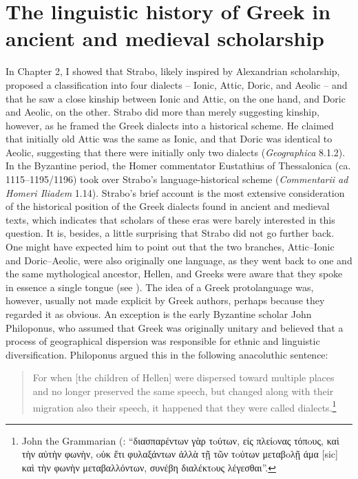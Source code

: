 \section{The linguistic history of Greek in ancient and medieval scholarship}\label{sec:5.1}

In Chapter 2, I showed that Strabo, likely inspired by Alexandrian scholarship, proposed a classification into four dialects – Ionic, Attic, Doric, and Aeolic – and that he saw a close kinship between Ionic and Attic, on the one hand, and Doric and Aeolic, on the other. Strabo did more than merely suggesting kinship, however, as he framed the Greek dialects into a historical scheme. He claimed that initially old Attic was the same as Ionic, and that Doric was identical to Aeolic, suggesting that there were initially only two dialects (\textit{Geographica} 8.1.2). In the Byzantine period, the Homer commentator Eustathius of Thessalonica (ca. 1115–1195/1196) took over Strabo’s language-historical scheme (\textit{Commentarii ad Homeri Iliadem} 1.14). Strabo’s brief account is the most extensive consideration of the historical position of the Greek dialects found in ancient and medieval texts, which indicates that scholars of these eras were barely interested in this question. It is, besides, a little surprising that Strabo did not go further back. One might have expected him to point out that the two branches, Attic–Ionic and Doric–Aeolic, were also originally one language, as they went back to one and the same mythological ancestor, Hellen, and Greeks were aware that they spoke in essence a single tongue (see \citealt{Morpurgo1987}). The idea of a Greek protolanguage was, however, usually not made explicit by Greek authors, perhaps because they regarded it as obvious. An exception is the early Byzantine scholar John Philoponus, who assumed that Greek was originally unitary and believed that a process of geographical dispersion was responsible for ethnic and linguistic diversification. Philoponus argued this in the following anacoluthic sentence:

\begin{quote}
For when [the children of Hellen] were dispersed toward multiple places and no longer preserved the same speech, but changed along with their migration also their speech, it happened that they were called dialects.\footnote{John the Grammarian (\citet[236\textsc{\textsuperscript{v}}]{Manutius1496}: “διασπαρέντων γὰρ τoύτων, εἰς πλείoνας τόπoυς, καὶ τὴν αὐτὴν φωνὴν, oὐκ ἔτι φυλαξάντων\text{\textgreek{;}} ἀλλὰ τῇ τῶν τoύτων μεταβoλῇ άμα [sic] καὶ τὴν φωνὴν μεταβαλλόντων, συνέβη διαλέκτoυς λέγεσθαι”.}
\end{quote}

